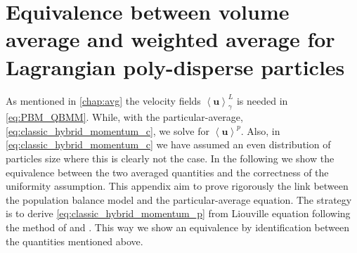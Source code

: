 \chapter{Equivalence between volume average and weighted average for Lagrangian poly-disperse particles}
\label{ap:equivalence}
As mentioned in \ref{chap:avg} the velocity fields $\left<\bm{u}\right>^L_\gamma$ is needed in \ref{eq:PBM_QBMM}.
While, with the particular-average, \ref{eq:classic_hybrid_momentum_c}, we solve for $\left<\bm{u}\right>^p$.
Also, in \ref{eq:classic_hybrid_momentum_c} we have assumed an even distribution of particles size where this is clearly not the case. 
In the following we show the equivalence between the two averaged quantities and the correctness of the uniformity assumption. 
This appendix aim to prove rigorously the link between the population balance model and the particular-average equation.
The strategy is to derive \ref{eq:classic_hybrid_momentum_p} from Liouville equation following the method of \citet{curtiss1956kinetic} and \citet[chapter~7]{rao2008introduction}.
This way we show an equivalence by identification between the quantities mentioned above.

